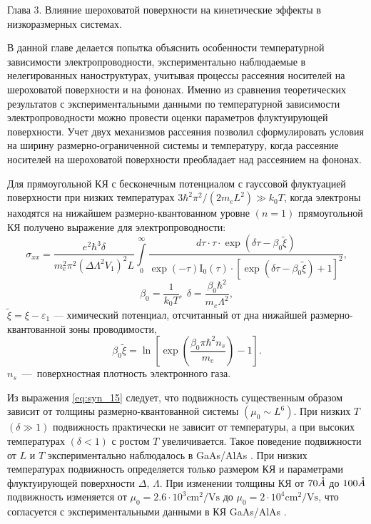 Глава 3. Влияние шероховатой поверхности на кинетические эффекты в низкоразмерных системах.

В данной главе делается попытка объяснить особенности температурной зависимости электропроводности, экспериментально наблюдаемые в нелегированных наноструктурах, учитывая процессы рассеяния носителей на шероховатой поверхности и на фононах. Именно из сравнения теоретических результатов с экспериментальными данными по температурной зависимости электропроводности можно провести оценки параметров флуктуирующей поверхности. Учет двух механизмов рассеяния позволил сформулировать условия на ширину размерно-ограниченной системы и температуру, когда рассеяние носителей на шероховатой поверхности преобладает над рассеянием на фононах.

Для прямоугольной КЯ с бесконечным потенциалом с гауссовой флуктуацией поверхности при низких температурах  $3\hbar^2 \pi^2 /\left(2m_e L^2 \right) \gg k_0 T$, когда электроны находятся на нижайшем размерно-квантованном уровне $(n=1)$ прямоугольной КЯ получено выражение для электропроводности:
\begin{equation} \label{eq:syn_15}
\sigma _{xx} =\frac{e^2 \hbar^3 \delta}{m_e^2 \pi^2 \left(\Delta \Lambda^2 V_1 \right)^2 L} \int\limits_0^\infty { \frac{d\tau \cdot \tau \cdot \exp \left(\delta \tau -\beta_0 \tilde{\xi }\right)}{\exp(-\tau )\mathrm{I}_0 (\tau )\cdot \left[\exp \left(\delta \tau -\beta_0 \tilde{\xi }\right)+1\right]^2 }},
\end{equation}
\[
\beta_0 = \frac{1}{k_0 T}, \; \delta =\frac{\beta_0 \hbar^2 }{m_e \Lambda^2 },
\] 
$\tilde{\xi }=\xi -\varepsilon _{1} $ --- химический потенциал, отсчитанный от дна нижайшей размерно-квантованной зоны проводимости,
\begin{equation} \label{eq:syn_16}
\beta_0 \tilde{\xi }=\ln\left[\exp\left(\frac{\beta_0 \pi \hbar^2 n_s }{m_e} \right)-1\right].
\end{equation}
$n_s $~---~поверхностная плотность электронного газа.

Из выражения \eqref{eq:syn_15} следует, что подвижность существенным образом зависит от толщины размерно-квантованной системы $(\mu_0 \sim L^6 )$. При низких $T$ $(\delta \gg 1)$ подвижность практически не зависит от температуры, а при высоких температурах $(\delta <1)$ с ростом $T$ увеличивается. Такое поведение подвижности от $L$ и $T$ экспериментально наблюдалось в GaAs/AlAs \cite{Sakaki1987}. При низких температурах подвижность определяется только размером КЯ и параметрами флуктуирующей поверхности $\Delta $, $\Lambda $. При изменении толщины КЯ от $70 \AA$ до $100 \AA$ подвижность изменяется от $\mu_0 =2.6\cdot 10^3 \text{cm}^2 / \text{Vs}$ до $\mu_0 =2\cdot 10^4 \text{cm}^2 /\text{Vs}$, что согласуется с экспериментальными данными в КЯ GaAs/AlAs \cite{Sakaki1987}.

